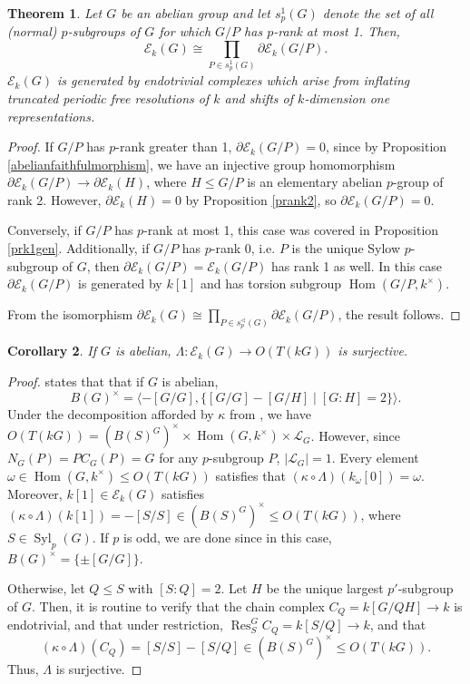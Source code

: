 \documentclass[10pt,letterpaper, boxed, cm]{amsart}
\newcommand{\Hom}{\operatorname{Hom}}
\newcommand{\Res}{\operatorname{Res}}
\newcommand{\Syl}{\operatorname{Syl}}
\newcommand{\calE}{\mathcal{E}}
\newtheorem{theorem}{Theorem}[section]
\newtheorem{corollary}[theorem]{Corollary}
\theoremstyle{remark}
\theoremstyle{definition}
\begin{document}
	\begin{theorem}
		Let $G$ be an abelian group and let $s_p^1(G)$ denote the set of all (normal) $p$-subgroups of $G$ for which $G/P$ has $p$-rank at most 1. Then,
		\[\calE_k(G) \cong \prod_{P \in s_p^1(G)}\partial\calE_k(G/P).\] $\calE_k(G)$ is generated by endotrivial complexes which arise from inflating truncated periodic free resolutions of $k$ and shifts of $k$-dimension one representations.
	\end{theorem}
	\begin{proof}
		If $G/P$ has $p$-rank greater than 1, $\partial\calE_k(G/P) = 0$, since by Proposition \ref{abelianfaithfulmorphism}, we have an injective group homomorphism $\partial \calE_k(G/P) \to \partial\calE_k(H)$, where $H \leq G/P$ is an elementary abelian $p$-group of rank 2. However, $ \partial\calE_k(H) = 0$ by Proposition \ref{prank2}, so $\partial\calE_k(G/P) = 0$.

		Conversely, if $G/P$ has $p$-rank at most 1, this case was covered in Proposition \ref{prk1gen}. Additionally, if $G/P$ has $p$-rank 0, i.e. $P$ is the unique Sylow $p$-subgroup of $G$, then $\partial\calE_k(G/P) = \calE_k(G/P)$ has rank 1 as well. In this case $\partial\calE_k(G/P)$ is generated by $k[1]$ and has torsion subgroup $\Hom(G/P, k^\times)$.

		From the isomorphism $\partial\calE_k(G) \cong \prod_{P\in s_p^\triangleleft(G)} \partial \calE_k(G/P)$, the result follows.
	\end{proof}

	\begin{corollary}\label{thm:abeliansurjective}
		If $G$ is abelian, $\Lambda: \calE_k(G) \to O(T(kG))$ is surjective.
	\end{corollary}
	\begin{proof}
		\cite[Example 4.5]{M83} states that that if $G$ is abelian, \[B(G)^\times = \langle -[G/G], \{ [G/G] - [G/H] \mid [G:H] = 2\} \rangle.\] Under the decomposition afforded by $\kappa$ from \cite{BC23}, we have $O(T(kG)) = (B(S)^G)^\times \times \Hom(G,k^\times) \times \mathcal{L}_G$. However, since $N_G(P) = PC_G(P) = G$ for any $p$-subgroup $P$, $|\mathcal{L}_G| = 1$. Every element $\omega \in  \Hom(G,k^\times) \leq O(T(kG))$ satisfies that $(\kappa\circ \Lambda)( k_\omega[0]) = \omega$. Moreover, $k[1] \in \calE_k(G)$ satisfies $(\kappa\circ\Lambda)(k[1]) = -[S/S] \in (B(S)^G)^\times \leq O(T(kG))$, where $S \in \Syl_p(G).$ If $p$ is odd, we are done since in this case, $B(G)^\times = \{\pm [G/G]\}$.

		Otherwise, let $Q \leq S$ with $[S:Q] = 2$. Let $H$ be the unique largest $p'$-subgroup of $G$. Then, it is routine to verify that the chain complex $C_Q = k[G/QH] \to k$ is endotrivial, and that under restriction, $\Res^G_S C_Q = k[S/Q]\to k$, and that \[(\kappa\circ\Lambda )(C_Q)= [S/S] - [S/Q] \in (B(S)^G)^\times \leq O(T(kG)).\] Thus, $\Lambda$ is surjective.
	\end{proof}
\end{document}
